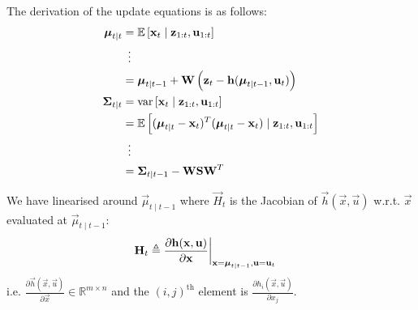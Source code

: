 The derivation of the update equations is as follows:
\begin{align}
	\vec \mu_{t \mid t}	&= \E\left[\vec x_t \mid \vec z_{1:t}, \vec u_{1:t}\right] \\
						&\,\,\,\vdots \\
						&= \vec \mu_{t \mid t - 1} + \vec W \left(\vec z_t - \vec h(\vec \mu_{t \mid t - 1}, \vec u_t)\right) \\
	\vec \Sigma_{t \mid t}	&= \var\left[\vec x_t \mid \vec z_{1:t}, \vec u_{1:t}\right] \\
							&= \E\left[(\vec \mu_{t \mid t} - \vec x_t)^T (\vec \mu_{t \mid t} - \vec x_t) \mid \vec z_{1:t}, \vec u_{1:t}\right] \\
							&\,\,\,\vdots \\
							&= \vec \Sigma_{t \mid t - 1} - \vec W \vec S \vec W^T
\end{align}

We have linearised around $\vec \mu_{t \mid t - 1}$ where $\vec H_t$ is the Jacobian of $\vec h(\vec x, \vec u)$ w.r.t. $\vec x$ evaluated at $\vec \mu_{t \mid t - 1}$:
\begin{align}
	\vec H_t	&\triangleq \frac{\partial \vec h(\vec x, \vec u)}{\partial \vec x}\at[\bigg]{\vec x = \vec \mu_{t \mid t - 1}, \vec u = \vec u_t}
\end{align}
i.e. $\frac{\partial \vec h(\vec x, \vec u)}{\partial \vec x} \in \mathbb R^{m \times n}$ and the $(i, j)^{\text{th}}$ element is $\frac{\partial h_i(\vec x, \vec u)}{\partial x_j}$.